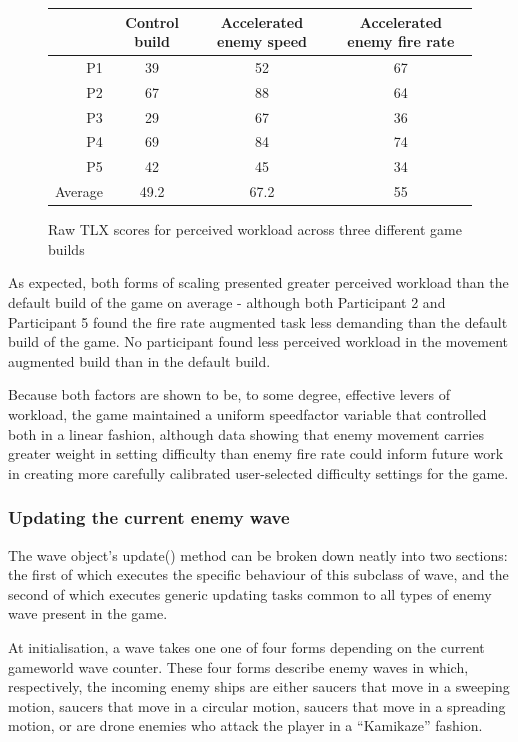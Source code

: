\documentclass[11pt]{article}
\begin{document}
\begin{figure}[h]
\begin{center}
\begin{tabular}{r|c|c|c}
      & Control build & Accelerated enemy speed & Accelerated enemy fire rate \\
     \hline
     P1 & 39 & 52 & 67 \\
     P2 & 67 & 88 & 64 \\
     P3 & 29 & 67 & 36 \\
     P4 & 69 & 84 & 74 \\
     P5 & 42 & 45 & 34 \\
     \hline
     Average & 49.2 & 67.2 & 55 \\
\end{tabular}
\end{center}
\caption{Raw TLX scores for perceived workload across three different game builds}
\label{fig:tlx}
\end{figure}

As expected, both forms of scaling presented greater perceived workload than the default build of
the game on average - although both Participant 2 and Participant 5 found the fire rate augmented
task less demanding than the default build of the game. No participant found less perceived
workload in the movement augmented build than in the default build.

Because both factors are shown to be, to some degree, effective levers of workload, the game
maintained a uniform speed\textunderscore factor variable that controlled both in a linear fashion,
although data showing that enemy movement carries greater weight in setting difficulty than enemy
fire rate could inform future work in creating more carefully calibrated user-selected difficulty
settings for the game.

\subsubsection*{Updating the current enemy wave}

The wave object's update() method can be broken down neatly into two sections: the first
of which executes the specific behaviour of this subclass of wave, and the second of
which executes generic updating tasks common to all types of enemy wave present in
the game.

At initialisation, a wave takes one one of four forms depending on the current
game\textunderscore world wave counter. These four forms describe enemy waves in which,
respectively, the incoming enemy ships are either saucers that move in a sweeping motion,
saucers that move in a circular motion, saucers that move in a spreading motion,
or are drone enemies who attack the player in a ``Kamikaze'' fashion.
\end{document}
